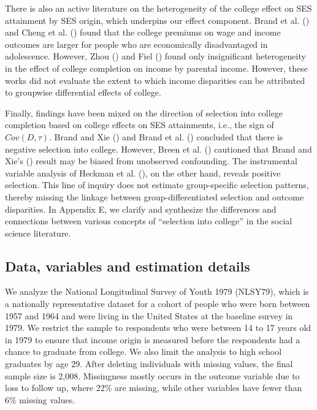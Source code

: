 \documentclass[12pt,a4paper]{article}
\begin{document}
There is also an active literature on the heterogeneity of the college effect on SES attainment by SES origin, which underpins our effect component. Brand et al. (\citeyear{brand_uncovering_2021}) and Cheng et al. (\citeyear{cheng_heterogeneous_2021}) found that the college premiums on wage and income outcomes are larger for people who are economically disadvantaged in adolescence. However, Zhou (\citeyear{zhou_equalization_2019}) and Fiel (\citeyear{fiel_great_2020}) found only insignificant heterogeneity in the effect of college completion on income by parental income. However, these works did not evaluate the extent to which income disparities can be attributed to groupwise differential effects of college.

Finally, findings have been mixed on the direction of selection into college completion based on college effects on SES attainments, i.e., the sign of $Cov(D, \tau)$. Brand and Xie (\citeyear{brand_who_2010}) and Brand et al. (\citeyear{brand_uncovering_2021}) concluded that there is negative selection into college. However, Breen et al. (\citeyear{breen_heterogeneous_2015}) cautioned that Brand and Xie's (\citeyear{brand_who_2010}) result may be biased from unobserved confounding. The instrumental variable analysis of Heckman et al. (\citeyear{heckman_returns_2018}), on the other hand, reveals positive selection. This line of inquiry does not estimate group-specific selection patterns, thereby missing the linkage between group-differentiated selection and outcome disparities. In Appendix E, we clarify and synthesize the differences and connections between various concepts of ``selection into college'' in the social science literature. 

\subsection{Data, variables and estimation details}
We analyze the National Longitudinal Survey of Youth 1979 (NLSY79), which is a nationally representative dataset for a cohort of people who were born between 1957 and 1964 and were living in the United States at the baseline survey in 1979.
We restrict the sample to respondents who were between 14 to 17 years old in 1979 to ensure that income origin is measured before the respondents had a chance to graduate from college. We also limit the analysis to high school graduates by age 29. After deleting individuals with missing values, the final sample size is 2,008. Missingness mostly occurs in the outcome variable due to loss to follow up, where 22\% are missing, while other variables have fewer than 6\% missing values.
\end{document}
